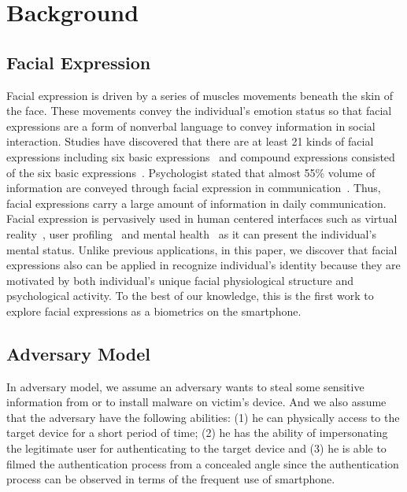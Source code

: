 \section{Background}
    \subsection{Facial Expression}
        Facial expression is driven by a series of muscles movements beneath the skin of the face. These movements convey the individual's emotion status so that facial expressions are a form of nonverbal language to convey information in social interaction. Studies have discovered that there are at least 21 kinds of facial expressions including six basic expressions~\cite{Ekman1972} and compound expressions consisted of the six basic expressions~\cite{Du2014Compound}. Psychologist stated that almost 55\% volume of information are conveyed through facial expression in communication~\cite{Lebow2009Communication}. Thus, facial expressions carry a large amount of information in daily communication. Facial expression is pervasively used in human centered interfaces such as virtual reality~\cite{Bekele2013Understanding}, user profiling~\cite{Arapakis2009Integrating} and mental health~\cite{Acharya2012Impact} as it can present the individual's mental status. Unlike previous applications, in this paper, we discover that facial expressions also can be applied in recognize individual's identity because they are motivated by both individual's unique facial physiological structure and psychological activity. To the best of our knowledge, this is the first work to explore facial expressions as a biometrics on the smartphone.
    \subsection{Adversary Model}
        In adversary model, we assume an adversary wants to steal some sensitive information from or to install malware on victim's device. And we also assume that the adversary have the following abilities: (1) he can physically access to the target device for a short period of time; (2) he has the ability of impersonating the legitimate user for authenticating to the target device and (3) he is able to filmed the authentication process from a concealed angle
        since the authentication process can be observed in terms of the frequent use of smartphone.

